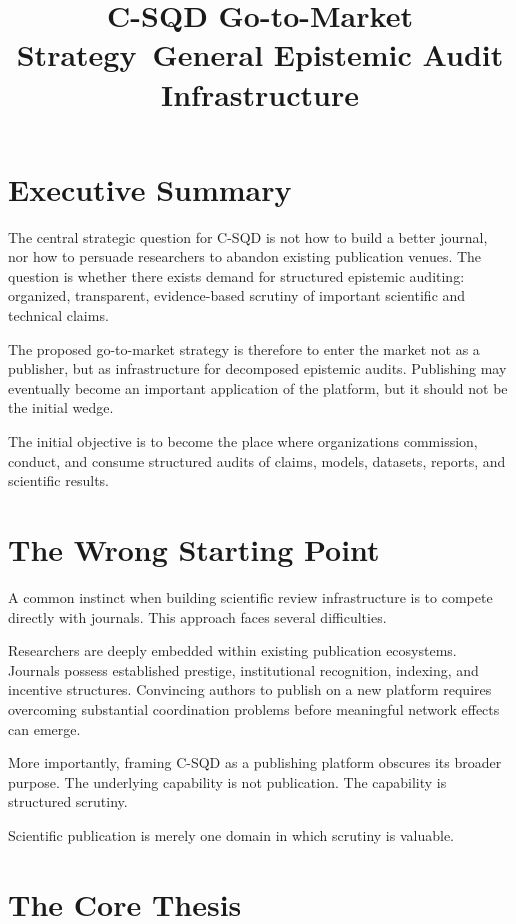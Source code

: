 \documentclass[11pt]{article}
\title{\textbf{C-SQD Go-to-Market Strategy}\
General Epistemic Audit Infrastructure}
\author{}
\date{}
\begin{document}
\maketitle

\section*{Executive Summary}

The central strategic question for C-SQD is not how to build a better journal, nor how to persuade researchers to abandon existing publication venues. The question is whether there exists demand for structured epistemic auditing: organized, transparent, evidence-based scrutiny of important scientific and technical claims.

The proposed go-to-market strategy is therefore to enter the market not as a publisher, but as infrastructure for decomposed epistemic audits. Publishing may eventually become an important application of the platform, but it should not be the initial wedge.

The initial objective is to become the place where organizations commission, conduct, and consume structured audits of claims, models, datasets, reports, and scientific results.

\section{The Wrong Starting Point}

A common instinct when building scientific review infrastructure is to compete directly with journals. This approach faces several difficulties.

Researchers are deeply embedded within existing publication ecosystems. Journals possess established prestige, institutional recognition, indexing, and incentive structures. Convincing authors to publish on a new platform requires overcoming substantial coordination problems before meaningful network effects can emerge.

More importantly, framing C-SQD as a publishing platform obscures its broader purpose. The underlying capability is not publication. The capability is structured scrutiny.

Scientific publication is merely one domain in which scrutiny is valuable.

\section{The Core Thesis}
\end{document}
